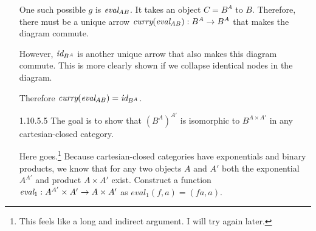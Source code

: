 \documentclass{article}
\newcommand{\curry}[1]{\emph{curry}(#1)}
\newcommand{\eval}{\emph{eval}}
\newcommand{\id}{\emph{id}}
\begin{document}
\begin{enumerate}
\begin{center}
  \end{center}

  One such possible $g$ is $\eval_{AB}$.
  It takes an object $C = B^A$ to $B$.
  Therefore, there must be a unique arrow $\curry{\eval_{AB}} : B^A \rightarrow B^A$ that makes the diagram commute.
  \begin{center}
  \end{center}
  
  However, $\id_{B^A}$ is another unique arrow that also makes this diagram commute.
  This is more clearly shown if we collapse identical nodes in the diagram.
  \begin{center}
  \end{center}

  Therefore $\curry{\eval_{AB}} = \id_{B^A}$.

\newpage
\item [1.10.5.5]
  The goal is to show that $(B^A)^{A'}$ is isomorphic to $B^{A \times A'}$ in any cartesian-closed category.

  Here goes.\footnote{This feels like a long and indirect argument. I will try again later.}
  Because cartesian-closed categories have exponentials and binary products, we know that for any two objects $A$ and $A'$ both the exponential $A^{A'}$ and product $A \times A'$ exist.
  Construct a function $\eval_1 : A^{A'} \times A' \rightarrow A \times A'$ as $eval_1(f,a) = (f a, a)$.


\end{enumerate}
\end{document}
